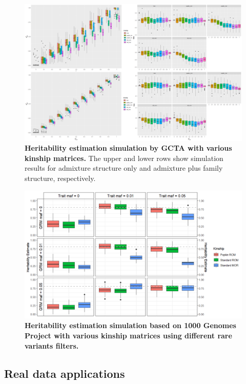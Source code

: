 \documentclass[11pt]{article}
\begin{document}
\begin{figure}[bp!]
  \centering
  \includegraphics[width=\textwidth]{data/Herit_sim_both.png}
  \caption{
    {\bf Heritability estimation simulation by GCTA with various kinship matrices.}
    The upper and lower rows show simulation results for admixture structure only and admixture plus family structure, respectively.
    }
  \label{fig:Herit_sim}
\end{figure}

\begin{figure}[bp!]
  \centering
  \includegraphics[width=\textwidth]{data/tgp_sim.png}
  \caption{
    {\bf Heritability estimation simulation based on 1000 Genomes Project with various kinship matrices using different rare variants filters.}
    }
  \label{fig:tgp_sim}
\end{figure}


\subsection{Real data applications}
\end{document}
